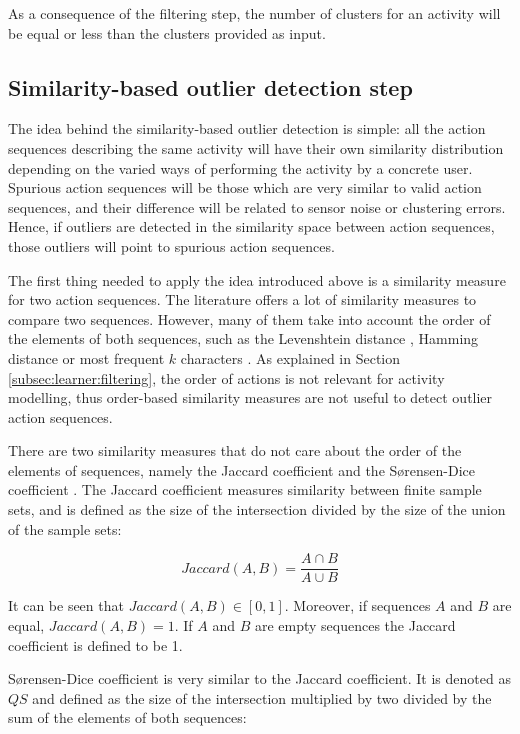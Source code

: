 As a consequence of the filtering step, the number of clusters for an activity will be equal or less than the clusters provided as input.


\subsection{Similarity-based outlier detection step}
\label{subsec:learner:outlier}
The idea behind the similarity-based outlier detection is simple: all the action sequences describing the same activity will have their own similarity distribution depending on the varied ways of performing the activity by a concrete user. Spurious action sequences will be those which are very similar to valid action sequences, and their difference will be related to sensor noise or clustering errors. Hence, if outliers are detected in the similarity space between action sequences, those outliers will point to spurious action sequences. 

The first thing needed to apply the idea introduced above is a similarity measure for two action sequences. The literature offers a lot of similarity measures to compare two sequences. However, many of them take into account the order of the elements of both sequences, such as the Levenshtein distance \cite{Levenshtein1966}, Hamming distance \cite{Hamming1950} or most frequent $k$ characters \cite{Seker2014}. As explained in Section \ref{subsec:learner:filtering}, the order of actions is not relevant for activity modelling, thus order-based similarity measures are not useful to detect outlier action sequences.

There are two similarity measures that do not care about the order of the elements of sequences, namely the Jaccard coefficient \cite{A.K.Jain1988} and the S{\o}rensen-Dice coefficient \cite{Sorensen1948}. The Jaccard coefficient measures similarity between finite sample sets, and is defined as the size of the intersection divided by the size of the union of the sample sets:

\begin{equation}
\label{eq-jaccard}
  Jaccard(A, B) = \frac{A \cap B}{A \cup B}
 \end{equation}

It can be seen that $Jaccard(A, B) \in [0, 1]$. Moreover, if sequences $A$ and $B$ are equal, $Jaccard(A, B) = 1$. If $A$ and $B$ are empty sequences the Jaccard coefficient is defined to be 1.

S{\o}rensen-Dice coefficient is very similar to the Jaccard coefficient. It is denoted as $QS$ and defined as the size of the intersection multiplied by two divided by the sum of the elements of both sequences:

